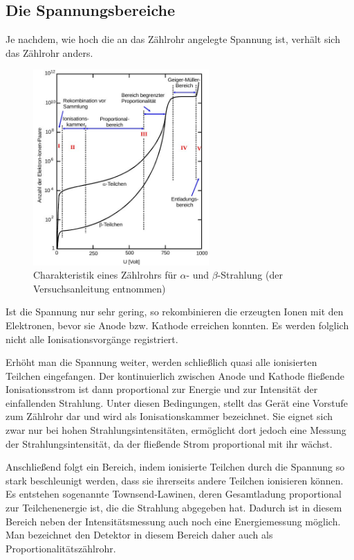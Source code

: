 \subsection{Die Spannungsbereiche}
\label{sec_spannungsbereiche}
Je nachdem, wie hoch die an das Zählrohr angelegte Spannung ist, verhält sich das Zählrohr anders.

\begin{figure}[h]
\includegraphics[width=0.6\textwidth]{pics/charak.jpg}
\caption{Charakteristik eines Zählrohrs für $\alpha$- und $\beta$-Strahlung (der Versuchsanleitung entnommen)}
\end{figure}

Ist die Spannung nur sehr gering, so rekombinieren die erzeugten Ionen mit den Elektronen, bevor sie Anode bzw. Kathode erreichen konnten. Es werden folglich nicht alle Ionisationsvorgänge registriert.

Erhöht man die Spannung weiter, werden schließlich quasi alle ionisierten Teilchen eingefangen. Der kontinuierlich zwischen Anode und Kathode fließende Ionisationsstrom ist dann proportional zur Energie und zur Intensität der einfallenden Strahlung. Unter diesen Bedingungen, stellt das Gerät eine Vorstufe zum Zählrohr dar und wird als Ionisationskammer bezeichnet. Sie eignet sich zwar nur bei hohen Strahlungsintensitäten, ermöglicht dort jedoch eine Messung der Strahlungsintensität, da der fließende Strom proportional mit ihr wächst.

Anschließend folgt ein Bereich, indem ionisierte Teilchen durch die Spannung so stark beschleunigt werden, dass sie ihrerseits andere Teilchen ionisieren können. Es entstehen sogenannte Townsend-Lawinen, deren Gesamtladung proportional zur Teilchenenergie ist, die die Strahlung abgegeben hat. Dadurch ist in diesem Bereich neben der Intensitätsmessung auch noch eine Energiemessung möglich. Man bezeichnet den Detektor in diesem Bereich daher auch als Proportionalitätszählrohr.

